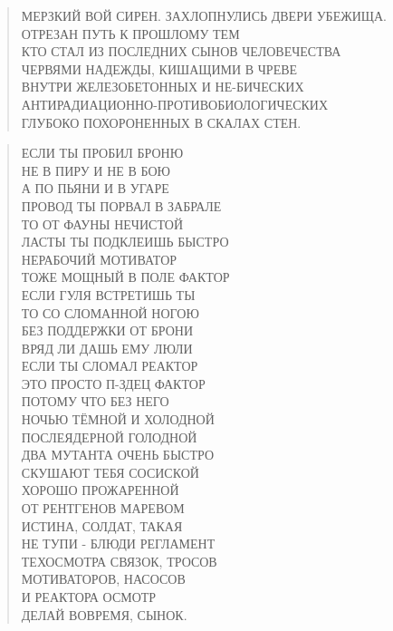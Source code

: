 \poemtitle{***}
\begin{verse}
МЕРЗКИЙ ВОЙ СИРЕН. ЗАХЛОПНУЛИСЬ ДВЕРИ УБЕЖИЩА.\\
ОТРЕЗАН ПУТЬ К ПРОШЛОМУ ТЕМ\\
КТО СТАЛ ИЗ ПОСЛЕДНИХ СЫНОВ ЧЕЛОВЕЧЕСТВА \\
ЧЕРВЯМИ НАДЕЖДЫ, КИШАЩИМИ В ЧРЕВЕ\\
ВНУТРИ ЖЕЛЕЗОБЕТОННЫХ И НЕ-БИЧЕСКИХ\\
АНТИРАДИАЦИОННО-ПРОТИВОБИОЛОГИЧЕСКИХ \\
ГЛУБОКО ПОХОРОНЕННЫХ В СКАЛАХ СТЕН.
\end{verse}

\poemtitle{***}
\begin{verse}
ЕСЛИ ТЫ ПРОБИЛ БРОНЮ \\
НЕ В ПИРУ И НЕ В БОЮ\\
А ПО ПЬЯНИ И В УГАРЕ \\
ПРОВОД ТЫ ПОРВАЛ В ЗАБРАЛЕ\\
ТО ОТ ФАУНЫ НЕЧИСТОЙ\\
ЛАСТЫ ТЫ ПОДКЛЕИШЬ БЫСТРО\\
НЕРАБОЧИЙ МОТИВАТОР\\
ТОЖЕ МОЩНЫЙ В ПОЛЕ ФАКТОР\\
ЕСЛИ ГУЛЯ ВСТРЕТИШЬ ТЫ\\
ТО СО СЛОМАННОЙ НОГОЮ \\
БЕЗ ПОДДЕРЖКИ ОТ БРОНИ\\
ВРЯД ЛИ ДАШЬ ЕМУ ЛЮЛИ\\
ЕСЛИ ТЫ СЛОМАЛ РЕАКТОР\\
ЭТО ПРОСТО П-ЗДЕЦ ФАКТОР\\
ПОТОМУ ЧТО БЕЗ НЕГО\\
НОЧЬЮ ТЁМНОЙ И ХОЛОДНОЙ\\
ПОСЛЕЯДЕРНОЙ ГОЛОДНОЙ\\
ДВА МУТАНТА ОЧЕНЬ БЫСТРО \\
СКУШАЮТ ТЕБЯ СОСИСКОЙ\\
ХОРОШО ПРОЖАРЕННОЙ\\
ОТ РЕНТГЕНОВ МАРЕВОМ\\
ИСТИНА, СОЛДАТ, ТАКАЯ\\
НЕ ТУПИ - БЛЮДИ РЕГЛАМЕНТ\\
ТЕХОСМОТРА СВЯЗОК, ТРОСОВ\\
МОТИВАТОРОВ, НАСОСОВ\\
И РЕАКТОРА ОСМОТР\\
ДЕЛАЙ ВОВРЕМЯ, СЫНОК.
\end{verse}

